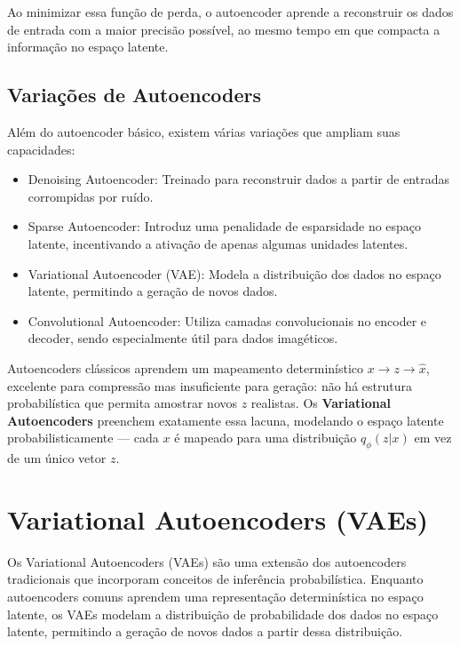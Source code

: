 \documentclass{tufte-handout}
\begin{document}
Ao minimizar essa função de perda, o autoencoder aprende a reconstruir os dados de entrada com a maior precisão possível, ao mesmo tempo em que compacta a informação no espaço latente.

\subsection{Variações de Autoencoders}

Além do autoencoder básico, existem várias variações que ampliam suas capacidades:
\begin{itemize}
    \item Denoising Autoencoder: Treinado para reconstruir dados a partir de entradas corrompidas por ruído.
    \item Sparse Autoencoder: Introduz uma penalidade de esparsidade no espaço latente, incentivando a ativação de apenas algumas unidades latentes.
    \item Variational Autoencoder (VAE): Modela a distribuição dos dados no espaço latente, permitindo a geração de novos dados.
    \item Convolutional Autoencoder: Utiliza camadas convolucionais no encoder e decoder, sendo especialmente útil para dados imagéticos.
\end{itemize}

\medskip
\noindent Autoencoders clássicos aprendem um mapeamento determinístico $x \rightarrow z \rightarrow \hat{x}$, excelente para compressão mas insuficiente para geração: não há estrutura probabilística que permita amostrar novos $z$ realistas. Os \textbf{Variational Autoencoders} preenchem exatamente essa lacuna, modelando o espaço latente probabilisticamente --- cada $x$ é mapeado para uma distribuição $q_\phi(z|x)$ em vez de um único vetor $z$.

\section{Variational Autoencoders (VAEs)}

Os Variational Autoencoders (VAEs) são uma extensão dos autoencoders tradicionais que incorporam conceitos de inferência probabilística. 
Enquanto autoencoders comuns aprendem uma representação determinística no espaço latente, os VAEs modelam a distribuição de probabilidade dos dados no espaço latente, permitindo a 
geração de novos dados a partir dessa distribuição. 
\end{document}
